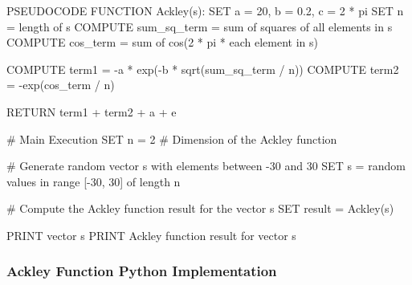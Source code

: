 \documentclass[
  letterpaper,
  DIV=11,
  numbers=noendperiod]{scrreprt}
\newenvironment{Shaded}{\begin{snugshade}}{\end{snugshade}}
\newcommand{\NormalTok}[1]{\textcolor[rgb]{0.00,0.23,0.31}{#1}}
\begin{document}
\begin{Shaded}
\begin{Highlighting}[]
\NormalTok{PSEUDOCODE}
\NormalTok{FUNCTION Ackley(s):}
\NormalTok{    SET a = 20, b = 0.2, c = 2 * pi}
\NormalTok{    SET n = length of s}
\NormalTok{    COMPUTE sum\_sq\_term = sum of squares of all elements in s}
\NormalTok{    COMPUTE cos\_term = sum of cos(2 * pi * each element in s)}
    
\NormalTok{    COMPUTE term1 = {-}a * exp({-}b * sqrt(sum\_sq\_term / n))}
\NormalTok{    COMPUTE term2 = {-}exp(cos\_term / n)}
    
\NormalTok{    RETURN term1 + term2 + a + e}

\NormalTok{\# Main Execution}
\NormalTok{SET n = 2  \# Dimension of the Ackley function}

\NormalTok{\# Generate random vector s with elements between {-}30 and 30}
\NormalTok{SET s = random values in range [{-}30, 30] of length n}

\NormalTok{\# Compute the Ackley function result for the vector s}
\NormalTok{SET result = Ackley(s)}

\NormalTok{PRINT vector s}
\NormalTok{PRINT Ackley function result for vector s}
\end{Highlighting}
\end{Shaded}

\subsubsection{Ackley Function Python
Implementation}\label{ackley-function-python-implementation}
\end{document}
